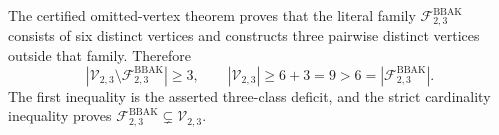 The certified omitted-vertex theorem proves that the literal family \(\mathcal F^{\mathrm{BBAK}}_{2,3}\) consists of six distinct vertices and constructs three pairwise distinct vertices outside that family. Therefore
\[|\mathcal V_{2,3}\setminus\mathcal F^{\mathrm{BBAK}}_{2,3}|\ge3,\qquad |\mathcal V_{2,3}|\ge6+3=9>6=|\mathcal F^{\mathrm{BBAK}}_{2,3}|.\]
The first inequality is the asserted three-class deficit, and the strict cardinality inequality proves \(\mathcal F^{\mathrm{BBAK}}_{2,3}\subsetneq\mathcal V_{2,3}\).